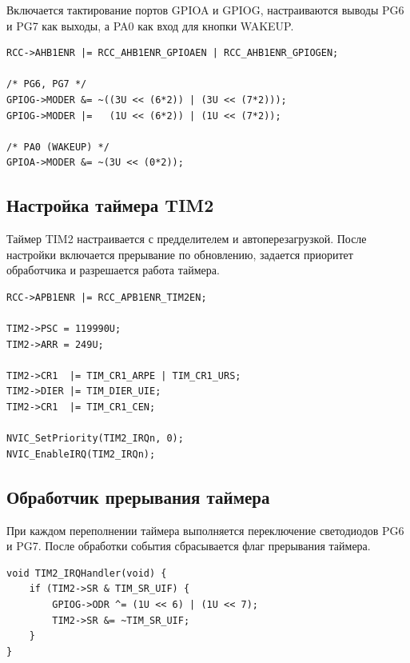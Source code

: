 Включается тактирование портов GPIOA и GPIOG, настраиваются выводы PG6 и PG7 как выходы, а PA0 как вход для кнопки WAKEUP.

\begin{listing}[H]
\caption{GPIO initialization}
\begin{verbatim}
RCC->AHB1ENR |= RCC_AHB1ENR_GPIOAEN | RCC_AHB1ENR_GPIOGEN;

/* PG6, PG7 */
GPIOG->MODER &= ~((3U << (6*2)) | (3U << (7*2)));
GPIOG->MODER |=   (1U << (6*2)) | (1U << (7*2));

/* PA0 (WAKEUP) */
GPIOA->MODER &= ~(3U << (0*2));
\end{verbatim}
\end{listing}

\subsection{Настройка таймера TIM2}

Таймер TIM2 настраивается с предделителем и автоперезагрузкой.
После настройки включается прерывание по обновлению, задается приоритет обработчика и разрешается работа таймера.

\begin{listing}[H]
\caption{TIM2 setup}
\begin{verbatim}
RCC->APB1ENR |= RCC_APB1ENR_TIM2EN;

TIM2->PSC = 119990U;
TIM2->ARR = 249U;

TIM2->CR1  |= TIM_CR1_ARPE | TIM_CR1_URS;
TIM2->DIER |= TIM_DIER_UIE;
TIM2->CR1  |= TIM_CR1_CEN;

NVIC_SetPriority(TIM2_IRQn, 0);
NVIC_EnableIRQ(TIM2_IRQn);
\end{verbatim}
\end{listing}

\subsection{Обработчик прерывания таймера}

При каждом переполнении таймера выполняется переключение светодиодов PG6 и PG7.
После обработки события сбрасывается флаг прерывания таймера.

\begin{listing}[H]
\caption{TIM2 IRQ Handler}
\begin{verbatim}
void TIM2_IRQHandler(void) {
    if (TIM2->SR & TIM_SR_UIF) {
        GPIOG->ODR ^= (1U << 6) | (1U << 7);
        TIM2->SR &= ~TIM_SR_UIF;
    }
}
\end{verbatim}
\end{listing}

